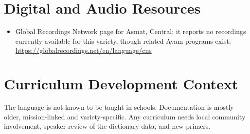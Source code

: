 \documentclass[12pt]{article}
\begin{document}
\section{Digital and Audio Resources}
\begin{itemize}
\item Global Recordings Network page for Asmat, Central; it reports no recordings currently available for this variety, though related Ayam programs exist: \url{https://globalrecordings.net/en/language/cns}
\end{itemize}
\section{Curriculum Development Context}
The language is not known to be taught in schools. Documentation is mostly older, mission-linked and variety-specific. Any curriculum needs local community involvement, speaker review of the dictionary data, and new primers.
\end{document}
